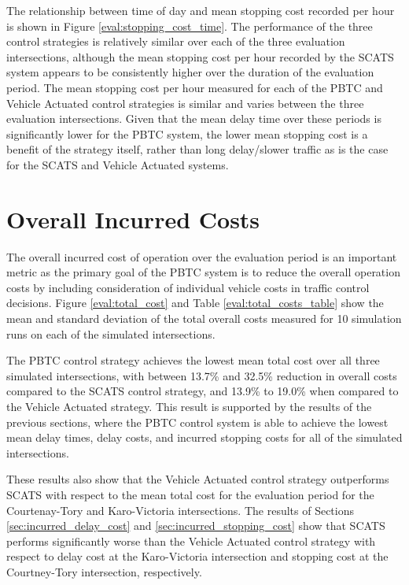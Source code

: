 The relationship between time of day and mean stopping cost recorded per hour is shown in Figure \ref{eval:stopping_cost_time}. The performance of the three control strategies is relatively similar over each of the three evaluation intersections, although the mean stopping cost per hour recorded by the SCATS system appears to be consistently higher over the duration of the evaluation period. The mean stopping cost per hour measured for each of the PBTC and Vehicle Actuated control strategies is similar and varies between the three evaluation intersections. Given that the mean delay time over these periods is significantly lower for the PBTC system, the lower mean stopping cost is a benefit of the strategy itself, rather than long delay/slower traffic as is the case for the SCATS and Vehicle Actuated systems.

\section{Overall Incurred Costs}

The overall incurred cost of operation over the evaluation period is an important metric as the primary goal of the PBTC system is to reduce the overall operation costs by including consideration of individual vehicle costs in traffic control  decisions. Figure \ref{eval:total_cost} and Table \ref{eval:total_costs_table} show the mean and standard deviation of the total overall costs measured for 10 simulation runs on each of the simulated intersections.

The PBTC control strategy achieves the lowest mean total cost over all three simulated intersections, with between 13.7\% and 32.5\% reduction in overall costs compared to the SCATS control strategy, and 13.9\% to 19.0\% when compared to the Vehicle Actuated strategy. This result is supported by the results of the previous sections, where the PBTC control system is able to achieve the lowest mean delay times, delay costs, and incurred stopping costs for all of the simulated intersections. 

These results also show that the Vehicle Actuated control strategy outperforms SCATS with respect to the mean total cost for the evaluation period for the Courtenay-Tory and Karo-Victoria intersections. The results of Sections \ref{sec:incurred_delay_cost} and \ref{sec:incurred_stopping_cost} show that SCATS performs significantly worse than the Vehicle Actuated control strategy with respect to delay cost at the Karo-Victoria intersection and stopping cost at the Courtney-Tory intersection, respectively.

